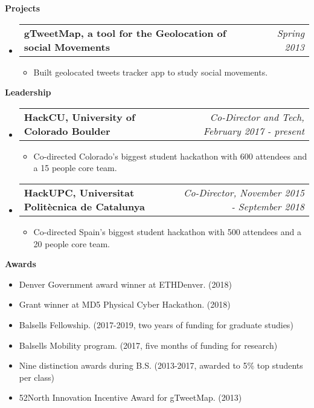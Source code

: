 \documentclass[letterpaper,10pt]{article}
\makeatletter
\newcommand{\resitem}[1]{\item #1 \vspace{-2pt}}
\newcommand{\resheading}[1]{{\large \colorbox{mygrey}{\begin{minipage}{\textwidth}{\textbf{#1 \vphantom{p\^{E}}}}\end{minipage}}}}
\newcommand{\ressubheading}[4]{
\begin{tabular*}{7.0in}{l@{\extracolsep{\fill}}r}
		\textbf{#1} & \textit{#4} \\
\end{tabular*}\vspace{-6pt}}
\makeatother
\begin{document}
\resheading{Projects}
\begin{itemize}
\item
	\ressubheading{gTweetMap, a tool for the Geolocation of social Movements}{Barcelona, Spain}{Student}{Spring 2013}
	\begin{itemize}
		\resitem{Built geolocated tweets tracker app to study social movements.}
	\end{itemize}
\end{itemize}

\resheading{Leadership}

\begin{itemize}

\item 
	\ressubheading{HackCU, University of Colorado Boulder}{Boulder, CO}{Co-Director and Web development}{Co-Director and Tech, February 2017 - present}
    \begin{itemize}
         \item Co-directed Colorado's biggest student hackathon with 600 attendees and a 15 people core team.
     \end{itemize}
\item
	\ressubheading{HackUPC, Universitat Polit\`ecnica de Catalunya}{Barcelona, Spain}{Co-Director and organizer}{Co-Director, November 2015 - September 2018}
	\begin{itemize}
		\item Co-directed Spain's biggest student hackathon with 500 attendees and a 20 people core team.
	\end{itemize}
\end{itemize}

\resheading{Awards}
\begin{itemize}
	\resitem{Denver Government award winner at ETHDenver. (2018)}
	\resitem{Grant winner at MD5 Physical Cyber Hackathon. (2018)}
    \resitem{Balsells Fellowship. (2017-2019, two years of funding for graduate studies)}
    \resitem{Balsells Mobility program. (2017, five months of funding for research)}
    \resitem{Nine distinction awards during B.S. (2013-2017, awarded to 5\% top students per class)}
    \resitem{52North Innovation Incentive Award for gTweetMap. (2013)}
\end{itemize}

  
\end{document}
